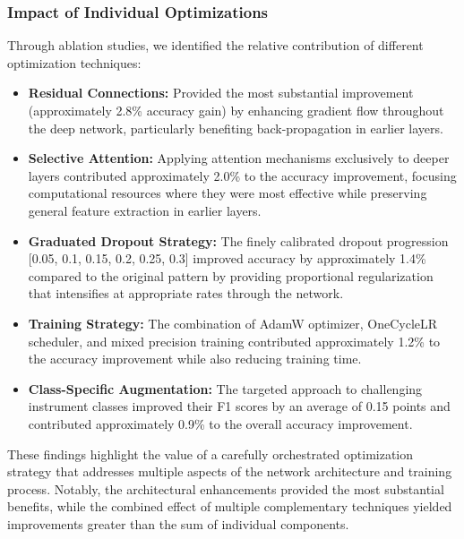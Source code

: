 \subsubsection{Impact of Individual Optimizations}
Through ablation studies, we identified the relative contribution of different optimization techniques:

\begin{itemize}
    \item \textbf{Residual Connections:} Provided the most substantial improvement (approximately 2.8\% accuracy gain) by enhancing gradient flow throughout the deep network, particularly benefiting back-propagation in earlier layers.
    
    \item \textbf{Selective Attention:} Applying attention mechanisms exclusively to deeper layers contributed approximately 2.0\% to the accuracy improvement, focusing computational resources where they were most effective while preserving general feature extraction in earlier layers.
    
    \item \textbf{Graduated Dropout Strategy:} The finely calibrated dropout progression [0.05, 0.1, 0.15, 0.2, 0.25, 0.3] improved accuracy by approximately 1.4\% compared to the original pattern by providing proportional regularization that intensifies at appropriate rates through the network.
    
    \item \textbf{Training Strategy:} The combination of AdamW optimizer, OneCycleLR scheduler, and mixed precision training contributed approximately 1.2\% to the accuracy improvement while also reducing training time.
    
    \item \textbf{Class-Specific Augmentation:} The targeted approach to challenging instrument classes improved their F1 scores by an average of 0.15 points and contributed approximately 0.9\% to the overall accuracy improvement.
\end{itemize}

These findings highlight the value of a carefully orchestrated optimization strategy that addresses multiple aspects of the network architecture and training process. Notably, the architectural enhancements provided the most substantial benefits, while the combined effect of multiple complementary techniques yielded improvements greater than the sum of individual components.


